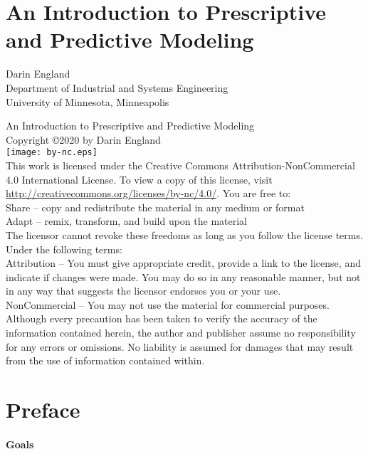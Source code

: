 \documentclass[11pt]{report}
\begin{document}
\chapter*{\Huge \center An Introduction to Prescriptive
  and Predictive Modeling}
\thispagestyle{empty}
\begin{center}
{\large Darin England\\
Department of Industrial and Systems Engineering\\
University of Minnesota, Minneapolis}
\end{center}

\newpage
\noindent
An Introduction to Prescriptive and Predictive Modeling\\
Copyright \copyright 2020 by Darin England\\
\texttt{[image: by-nc.eps]}\\
This work is licensed under the Creative Commons Attribution-NonCommercial 4.0
International License. To view a copy of this license,
visit \url{http://creativecommons.org/licenses/by-nc/4.0/}.
You are free to:\\
Share – copy and redistribute the material in any medium or format\\
Adapt – remix, transform, and build upon the material\\
The licensor cannot revoke these freedoms as long as you follow the license terms.
Under the following terms:\\
Attribution – You must give appropriate credit, provide a link to the license,
and indicate if changes were made. You may do so in any reasonable manner,
but not in any way that suggests the licensor endorses you or your use.\\
NonCommercial – You may not use the material for commercial purposes.\\
Although every precaution has been taken to verify the accuracy of the
information contained herein, the author and publisher assume no
responsibility for any errors or omissions. No liability is assumed
for damages that may result from the use of information contained
within.

\tableofcontents
\chapter*{Preface}

\subsubsection*{Goals} 
\end{document}
